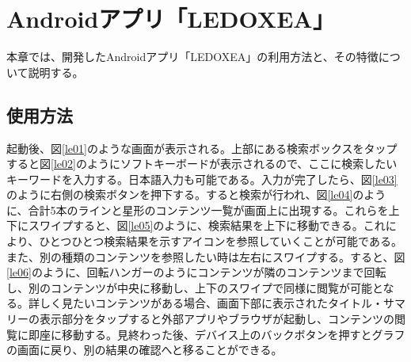 \chapter{Androidアプリ「LEDOXEA」}
\label{chap:ledoxea}

本章では、開発したAndroidアプリ「LEDOXEA」の利用方法と、その特徴について説明する。

\section{使用方法}
起動後、図\ref{le01}のような画面が表示される。上部にある検索ボックスをタップすると図\ref{le02}のようにソフトキーボードが表示されるので、ここに検索したいキーワードを入力する。日本語入力も可能である。入力が完了したら、図\ref{le03}のように右側の検索ボタンを押下する。すると検索が行われ、図\ref{le04}のように、合計5本のラインと星形のコンテンツ一覧が画面上に出現する。これらを上下にスワイプすると、図\ref{le05}のように、検索結果を上下に移動できる。これにより、ひとつひとつ検索結果を示すアイコンを参照していくことが可能である。また、別の種類のコンテンツを参照したい時は左右にスワイプする。すると、図\ref{le06}のように、回転ハンガーのようにコンテンツが隣のコンテンツまで回転し、別のコンテンツが中央に移動し、上下のスワイプで同様に閲覧が可能となる。詳しく見たいコンテンツがある場合、画面下部に表示されたタイトル・サマリーの表示部分をタップすると外部アプリやブラウザが起動し、コンテンツの閲覧に即座に移動する。見終わった後、デバイス上のバックボタンを押すとグラフの画面に戻り、別の結果の確認へと移ることができる。


